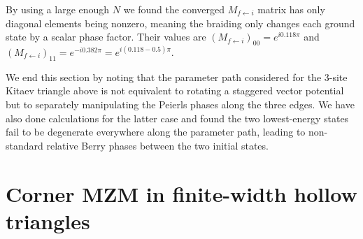\documentclass[aps,prb,showpacs,amsmath,amssymb,superscriptaddress]{revtex4-2}
\begin{document}
By using a large enough $N$ we found the converged $M_{f\leftarrow i}$ matrix has only diagonal elements being nonzero, meaning the braiding only changes each ground state by a scalar phase factor. Their values are $(M_{f\leftarrow i})_{00} = e^{i0.118\pi}$ and $(M_{f\leftarrow i})_{11} = e^{-i 0.382\pi} = e^{i(0.118-0.5)\pi}$.

We end this section by noting that the parameter path considered for the 3-site Kitaev triangle above is not equivalent to rotating a staggered vector potential but to separately manipulating the Peierls phases along the three edges. We have also done calculations for the latter case and found the two lowest-energy states fail to be degenerate everywhere along the parameter path, leading to non-standard relative Berry phases between the two initial states.

\section{Corner MZM in finite-width hollow triangles}
\end{document}
